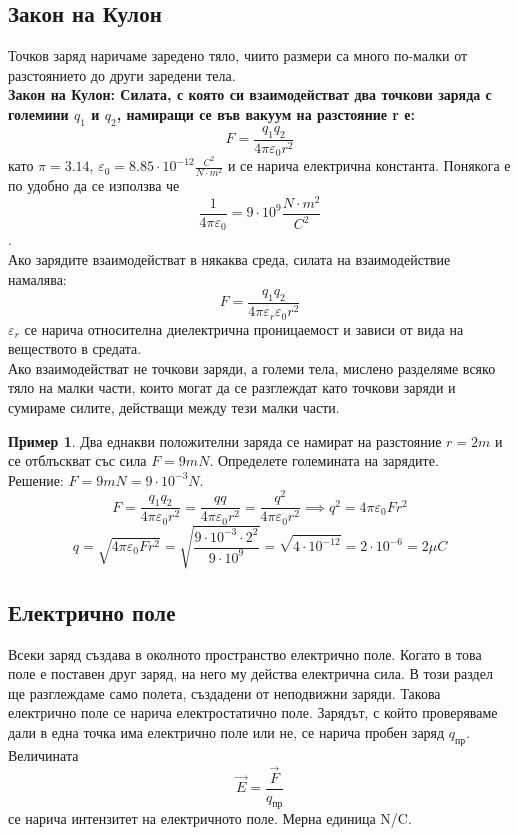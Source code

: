 \documentclass[fleqn, 12pt]{article}
\theoremstyle{definition}
\newtheorem{example}{Пример}[subsection]
\begin{document}
\subsection{Закон на Кулон}
Точков заряд наричаме заредено тяло, чиито размери са много по-малки от
разстоянието до други заредени тела.\\
\textbf{Закон на Кулон: Силата, с която си взаимодействат два точкови заряда с
големини $q_1$ и $q_2$, намиращи се във вакуум на разстояние r е:}
$$F = \frac{q_1 q_2}{4 \pi \varepsilon_0 r^2}$$
като $\pi = 3.14, \, \varepsilon_0 = 8.85 \cdot 10^{-12} \frac{C^2}{N \cdot m^2}$ и се нарича електрична константа.
Понякога е по удобно да се използва че $$\frac{1}{4 \pi \varepsilon_0} = 9 \cdot 10^9 \frac{N\cdot m^2}{C^2}$$. \\
Ако зарядите взаимодействат в някаква среда, силата на взаимодействие намалява: 
$$F = \frac{q_1 q_2}{4 \pi \varepsilon_r \varepsilon_0 r^2}$$
$\varepsilon_r$ се нарича относителна диелектрична проницаемост и зависи от вида на веществото в средата. \\
Ако взаимодействат не точкови заряди, а големи тела, мислено разделяме всяко
тяло на малки части, които могат да се разглеждат като точкови заряди и сумираме
силите, действащи между тези малки части. 

\begin{example}
Два еднакви положителни заряда се намират на разстояние $r = 2 m$ и се
отблъскват със сила $F = 9 mN$. Определете големината на зарядите. \\
Решение: $F = 9mN = 9 \cdot 10^{-3}N$.
$$F = \frac{q_1 q_2}{4 \pi \varepsilon_0 r^2} = \frac{q q}{4 \pi \varepsilon_0 r^2} = \frac{q^2}{4 \pi \varepsilon_0 r^2} \implies q^2 = 4 \pi \varepsilon_0 F r^2$$
$$q = \sqrt{ 4 \pi \varepsilon_0 F r^2} = \sqrt{\frac{9\cdot 10^{-3} \cdot 2^2}{9 \cdot 10^9}} = \sqrt{4 \cdot 10^{-12}} = 2 \cdot 10^{-6} = 2 \mu C$$
\end{example}

\newpage
\subsection{Електрично поле}
Всеки заряд създава в околното пространство електрично поле. Когато в това
поле е поставен друг заряд, на него му действа електрична сила. В този раздел ще
разглеждаме само полета, създадени от неподвижни заряди. Такова електрично поле се
нарича електростатично поле. Зарядът, с който проверяваме дали в една точка има
електрично поле или не, се нарича пробен заряд $q_{\text{пр}}$.\\
Величината 
$$\vec{E} = \frac{\vec{F}}{q_{\text{пр}}}$$
се нарича интензитет на електричното поле. Мерна единица N/C. 
\end{document}
